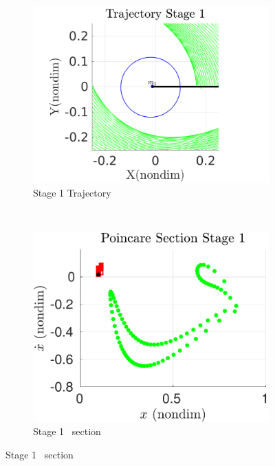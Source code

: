 \begin{figure}[htbp]
    \centering
    \begin{subfigure}[htbp]{0.5\textwidth} 
        \includegraphics[width=\textwidth, keepaspectratio]{figures/2017_JAS/stage1_trajectory_zoom.pdf} 
        \caption{Stage 1 Trajectory~\label{fig:stage1_trajecotry_zoom}} 
    \end{subfigure}~
    \begin{subfigure}[htbp]{0.5\textwidth} 
        \includegraphics[width=\textwidth, keepaspectratio]{figures/2017_JAS/stage1_poincare.pdf} 
        \caption{Stage 1 \Poincare~section \label{fig:stage1_poincare}} 
    \end{subfigure}



\end{figure}
